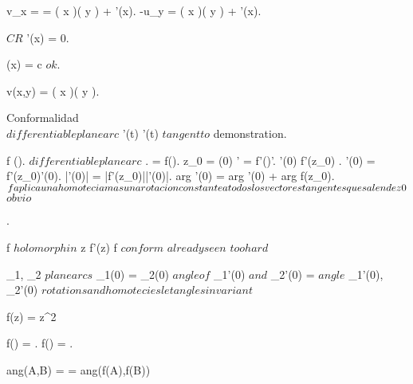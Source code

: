 \documentclass[../Main/main]{subfiles}
\begin{document}
{{{			v_x =  = \exp( x )\sin( y ) + \phi'(x).
			-u_y = \exp( x )\sin( y ) + \phi'(x).

			$CR$ \imp \phi'(x) = 0.

			{
				\phi(x) = c $ ok $.
			}

			v(x,y) = \exp( x )\sin( y ).



		}
	}
	
	
	
	
	
	
	Conformalidad \\

	
	
	
	{
		{
			\gamma $ differentiable plane arc $ \suchthat {}
			{
				\gamma'(t) 
			}
		}
		\holds
		{
			\gamma'(t) $ tangent to $ \gamma
		}
		\demonstration
		{
			demonstration.
		}
	}
	
	
	{
		{
			f \in \Hc(\Uc).
			\gamma $ differentiable plane arc $ \suchthat \gamma \subset \Uc.
			\sigma = f(\gamma).
			z_0 = \gamma(0)
		}
		\holds
		{
			\sigma' = f'(\gamma)\gamma'.
			\gamma'(0)  \imp f'(z_0) .
			\sigma'(0) = f'(z_0)\gamma'(0).
			|\sigma'(0)| = |f'(z_0)||\gamma'(0)|.
			arg \sigma'(0) = arg \gamma'(0) + arg f(z_0).
			$ f aplica una homotecia mas una rotacion constante a todos los \\ vectores tangentes que salen de z0 $
		}
		\demonstration
		{
			$obvio$
		}
	}


	
	
	{
		{
			.
			
		}
		\holds
		{
			f $holomorph in $ z \suchthat f'(z)  \ifandonlyif f $ conform $
		}
		\demonstration
		{
			\rightway
			{
				$ already seen $
			}
			\leftway
			{
				$ too hard $
			}	
		}
	}
	
	
	{
		{
			\gamma_1, \gamma_2 $ plane arcs $ \suchthat \gamma_1(0) = \gamma_2(0)
		}
		\holds
		{
			$ angle of $ \gamma_1'(0) $ and $ \gamma_2'(0) = $ angle $ \sigma_1'(0), \sigma_2'(0) 
		}
		\demonstration
		{
			$ rotations and homotecies let angles invariant $
		}
	}
	
	
	{
		{
			f(z) = z^2
		}
		{
			f() = .
			f() = .

			ang(A,B) = \pi {} = ang(f(A),f(B))
		}
	}
	
	

	

	
	
	
	
	
	
	
	
	
	


	
	
	
	
	
	
	



}
\end{document}

